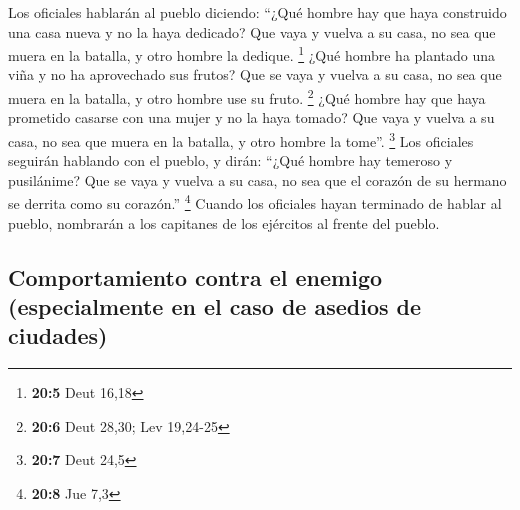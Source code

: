  Los oficiales hablarán al pueblo diciendo: ``¿Qué hombre
hay que haya construido una casa nueva y no la haya dedicado? Que vaya y
vuelva a su casa, no sea que muera en la batalla, y otro hombre la
dedique. \footnote{\textbf{20:5} Deut 16,18}  ¿Qué hombre
ha plantado una viña y no ha aprovechado sus frutos? Que se vaya y
vuelva a su casa, no sea que muera en la batalla, y otro hombre use su
fruto. \footnote{\textbf{20:6} Deut 28,30; Lev 19,24-25} 
¿Qué hombre hay que haya prometido casarse con una mujer y no la haya
tomado? Que vaya y vuelva a su casa, no sea que muera en la batalla, y
otro hombre la tome''. \footnote{\textbf{20:7} Deut 24,5} 
Los oficiales seguirán hablando con el pueblo, y dirán: ``¿Qué hombre
hay temeroso y pusilánime? Que se vaya y vuelva a su casa, no sea que el
corazón de su hermano se derrita como su corazón.'' \footnote{\textbf{20:8}
  Jue 7,3}  Cuando los oficiales hayan terminado de hablar
al pueblo, nombrarán a los capitanes de los ejércitos al frente del
pueblo.

\hypertarget{comportamiento-contra-el-enemigo-especialmente-en-el-caso-de-asedios-de-ciudades}{%
\subsection{Comportamiento contra el enemigo (especialmente en el caso
de asedios de
ciudades)}\label{comportamiento-contra-el-enemigo-especialmente-en-el-caso-de-asedios-de-ciudades}}

